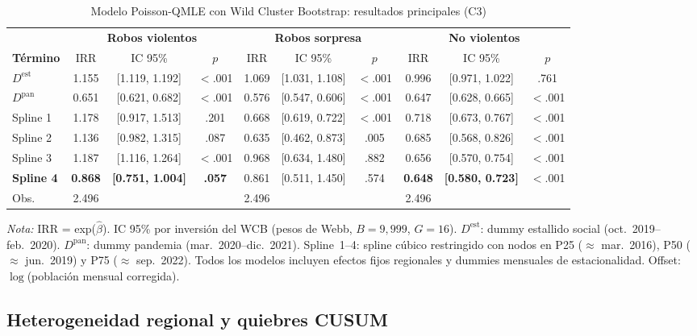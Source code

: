 \documentclass[12pt,a4paper]{article}
\newcommand{\tablenote}[1]{%
  \vspace{2pt}%
  \begin{minipage}{\linewidth}%
    \footnotesize\textit{Nota:} #1%
  \end{minipage}%
}
\begin{document}
\begin{table}[H]
\centering
\caption{Modelo Poisson-QMLE con Wild Cluster Bootstrap: resultados principales (C3)}
\label{tab:poisson}
\footnotesize
\begin{adjustbox}{max width=\columnwidth}
\begin{tabular}{l@{\hskip 3mm}ccc@{\hskip 4mm}ccc@{\hskip 4mm}ccc}
\toprule
 & \multicolumn{3}{c}{\textbf{Robos violentos}} & \multicolumn{3}{c}{\textbf{Robos sorpresa}} & \multicolumn{3}{c}{\textbf{No violentos}} \\
\cmidrule(lr){2-4}\cmidrule(lr){5-7}\cmidrule(lr){8-10}
\textbf{T\'ermino} & IRR & IC 95\% & $p$ & IRR & IC 95\% & $p$ & IRR & IC 95\% & $p$ \\
\midrule
$D^{\text{est}}$ & 1.155 & [1.119, 1.192] & $<$.001 & 1.069 & [1.031, 1.108] & $<$.001 & 0.996 & [0.971, 1.022] & .761 \\
$D^{\text{pan}}$ & 0.651 & [0.621, 0.682] & $<$.001 & 0.576 & [0.547, 0.606] & $<$.001 & 0.647 & [0.628, 0.665] & $<$.001 \\
\midrule
Spline 1    & 1.178 & [0.917, 1.513] & .201 & 0.668 & [0.619, 0.722] & $<$.001 & 0.718 & [0.673, 0.767] & $<$.001 \\
Spline 2    & 1.136 & [0.982, 1.315] & .087 & 0.635 & [0.462, 0.873] & .005 & 0.685 & [0.568, 0.826] & $<$.001 \\
Spline 3    & 1.187 & [1.116, 1.264] & $<$.001 & 0.968 & [0.634, 1.480] & .882 & 0.656 & [0.570, 0.754] & $<$.001 \\
\textbf{Spline 4} & \textbf{0.868} & \textbf{[0.751, 1.004]} & \textbf{.057} & 0.861 & [0.511, 1.450] & .574 & \textbf{0.648} & \textbf{[0.580, 0.723]} & $<$.001 \\
\midrule
Obs. & 2.496 & & & 2.496 & & & 2.496 & & \\
\bottomrule
\end{tabular}
\end{adjustbox}
\tablenote{IRR = exp($\hat{\beta}$). IC 95\% por inversi\'on del WCB (pesos de Webb,
$B=9{,}999$, $G=16$). $D^{\text{est}}$: dummy estallido social (oct.\ 2019--feb.\
2020). $D^{\text{pan}}$: dummy pandemia (mar.\ 2020--dic.\ 2021). Spline~1--4: spline
c\'ubico restringido con nodos en P25 ($\approx$ mar.\ 2016), P50 ($\approx$ jun.\ 2019)
y P75 ($\approx$ sep.\ 2022). Todos los modelos incluyen efectos fijos regionales y
dummies mensuales de estacionalidad. Offset: $\log$(poblaci\'on mensual corregida).}
\end{table}

\subsection{Heterogeneidad regional y quiebres CUSUM}
\label{sub:regional}
\end{document}
